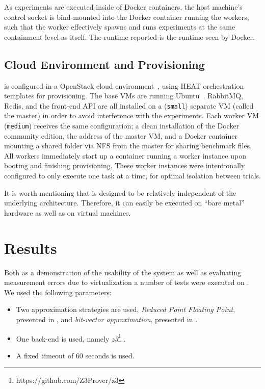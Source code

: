 \documentclass{article}
\begin{document}
\begin{multicols}{2}
As experiments are executed inside of Docker containers, the host machine's
control socket is bind-mounted into the Docker container running the workers,
such that the worker effectively spawns and runs experiments at the same
containment level as itself. The runtime reported is the runtime seen by Docker.

\subsection*{Cloud Environment and Provisioning}

\testbench is configured in a OpenStack cloud environment~\cite{openstack}, using
HEAT orchestration templates for provisioning. The base VMs are running
Ubuntu~. RabbitMQ, Redis, and the front-end API are all installed
on a (\texttt{small}) separate VM (called the master) in order to avoid interference
with the experiments. Each worker VM (\texttt{medium}) receives the same
configuration; a clean installation of the Docker community edition, the address
of the master VM, and a Docker container mounting a shared folder via NFS from
the master for sharing benchmark files. All workers immediately start up a
container running a worker instance upon booting and finishing provisioning.
These worker instances were intentionally configured to only execute one task at
a time, for optimal isolation between trials.

It is worth mentioning that \testbench is designed to be relatively independent
of the underlying architecture. Therefore, it can easily be executed on ``bare
metal'' hardware as well as on virtual machines.

\section*{Results}
Both as a demonstration of the usability of the system as well as
evaluating measurement errors due to virtualization a number of tests
were executed on \testbench. We used the following parameters:
\begin{itemize}
\item Two approximation strategies are used, \emph{Reduced Point
  Floating Point}, presented in \cite{uppsat}, and \emph{bit-vector
  approximation}, presented in \cite{joel}.

\item One back-end is used, namely \emph{z3}\footnote{https://github.com/Z3Prover/z3}  .

\item A fixed timeout of 60 seconds is used.


\end{itemize}
\end{multicols}
\end{document}
